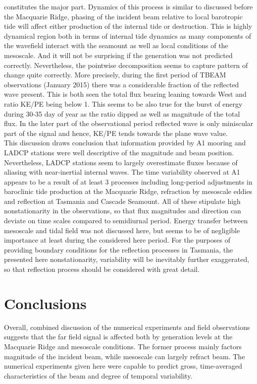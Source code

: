 \documentclass[12pt]{article}
\begin{document}
constitutes the major part. Dynamics of this process is similar to discussed before the 
Macquarie Ridge, phasing of the incident beam relative to local barotropic tide will affect 
either production of the internal tide or destruction. This is highly dynamical region both in 
terms of internal tide dynamics as many components of the wavefield interact with the seamount as 
well as local conditions of the mesoscale. And it will not be surprising if the generation was not 
predicted correctly. Nevertheless, the pointwise decomposition seems to capture pattern of change 
quite correctly. More precisely, during the first period of TBEAM observations (January 2015) there 
was a considerable fraction of the reflected wave present. This is both seen the total flux bearing 
leaning towards West and ratio KE/PE being below 1. This seems to be also true for the burst of 
energy during 30-35 day of year as the ratio dipped as well as magnitude of the total flux. In the 
later part of the observational period reflected wave is only miniscular part of the signal and 
hence, KE/PE tends towards the plane wave value.\\
This discussion draws conclusion that information provided by A1 mooring and LADCP stations 
were well descriptive of the magnitude and beam position. Nevertheless, LADCP stations seem to 
largely overestimate fluxes because of aliasing with near-inertial internal waves. The time 
variability observed at A1 appears to be a result of at least 3 processes including long-period 
adjustments in baroclinic tide production at the Macquarie Ridge, refraction by mesoscale eddies 
and reflection at Tasmania and Cascade Seamount. All of these stipulate high nonstationarity in the 
observations, so that flux magnitudes and direction can deviate on time scales compared to 
semidiurnal period. Energy transfer between mesoscale and tidal field was not discussed here, but 
seems to be of negligible importance at least during the considered here period. For the purposes 
of providing boundary conditions for the reflection processes in Tasmania, the presented here 
nonstationarity, variability will be inevitably further exaggerated, so that reflection process 
should be considered with great detail.

\section{Conclusions}
Overall, combined discussion of the numerical experiments and field observations suggests that the 
far field signal is affected both by generation levels at the Macquarie Ridge and mesoscale 
conditions. The former process mainly factors magnitude of the incident beam, while mesoscale can 
largely refract beam. The numerical experiments given here were capable to predict gross, 
time-averaged characteristics of the beam and degree of temporal variability. 
\end{document}
